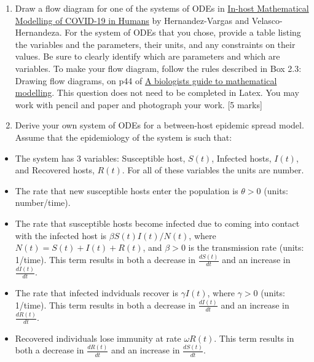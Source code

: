 \documentclass[]{book}
\begin{document}
\begin{enumerate}
\def\labelenumi{\arabic{enumi}.}
\item
  Draw a flow diagram for one of the systems of ODEs in
  \href{https://www-ncbi-nlm-nih-gov.qe2a-proxy.mun.ca/pmc/articles/PMC7526677/}{In-host
  Mathematical Modelling of COVID-19 in Humans} by Hernandez-Vargas and
  Velasco-Hernandeza. For the system of ODEs that you chose, provide a
  table listing the variables and the parameters, their units, and any
  constraints on their values. Be sure to clearly identify which are
  parameters and which are variables. To make your flow diagram, follow
  the rules described in Box 2.3: Drawing flow diagrams, on p44 of
  \href{https://ebookcentral-proquest-com.qe2a-proxy.mun.ca/lib/mun/reader.action?docID=768551\&ppg=44}{A
  biologists guide to mathematical modelling}. This question does not
  need to be completed in Latex. You may work with pencil and paper and
  photograph your work. {[}5 marks{]}
\item
  Derive your own system of ODEs for a between-host epidemic spread
  model. Assume that the epidemiology of the system is such that:
\end{enumerate}

\begin{itemize}
\item
  The system has 3 variables: Susceptible host, \(S(t)\), Infected
  hosts, \(I(t)\), and Recovered hosts, \(R(t)\). For all of these
  variables the units are number.
\item
  The rate that new susceptible hosts enter the population is
  \(\theta>0\) (units: number/time).
\item
  The rate that susceptible hosts become infected due to coming into
  contact with the infected host is \(\beta S(t) I(t)/N(t)\), where
  \(N(t) = S(t) + I(t) + R(t)\), and \(\beta>0\) is the transmission
  rate (units: 1/time). This term results in both a decrease in
  \(\frac{dS(t)}{dt}\) and an increase in \(\frac{dI(t)}{dt}\).
\item
  The rate that infected indviduals recover is \(\gamma I(t)\), where
  \(\gamma >0\) (units: 1/time). This term results in both a decrease in
  \(\frac{dI(t)}{dt}\) and an increase in \(\frac{dR(t)}{dt}\).
\item
  Recovered individuals lose immunity at rate \(\omega R(t)\). This term
  results in both a decrease in \(\frac{dR(t)}{dt}\) and an increase in
  \(\frac{dS(t)}{dt}\).
\end{itemize}
\end{document}
